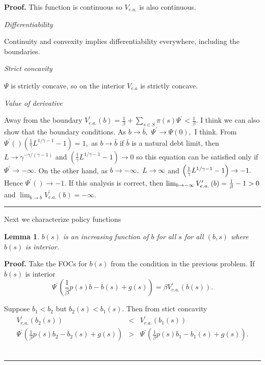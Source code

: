 \documentclass{article}
\newtheorem{lemma}[theorem]{Lemma}
\newenvironment{proof}[1][Proof]{\noindent\textbf{#1.} }{\ \rule{0.5em}{0.5em}}
\begin{document}
\begin{proof}
This function is continuous so $V_{e.a.}$ is also continuous.

\textit{Differentiability}

Continuity and convexity implies differentiability everywhere, including the
boundaries.

\textit{Strict concavity}

$\Psi $ is strictly concave, so on the interior $V_{e.a}$ is strictly
concave.

\textit{Value of derivative}

Away from the boundary $V_{e.a.}^{\prime }\left( b\right) =\frac{1}{\beta }%
+\sum_{s\in S}\pi \left( s\right) \Psi ^{\prime }<\frac{1}{\beta }.$ I think
we can also show that the boundary conditions. As $b\rightarrow \bar{b},$ $%
\Psi ^{\prime }\rightarrow \Psi \left( 0\right) ,$ I think. From $\Psi
^{\prime }\left( {}\right) \left( \frac{1}{\gamma }L^{1/\gamma -1}-1\right)
=1,$ as $b\rightarrow \bar{b}$ if $\bar{b}$ is a natural debt limit, then $%
L\rightarrow \gamma ^{-\gamma /\left( \gamma -1\right) }$ and $\left( \frac{1%
}{\gamma }L^{1/\gamma -1}-1\right) \rightarrow 0$ so this equation can be
satisfied only if $\Psi ^{\prime }\rightarrow -\infty .$ On the other hand,
as $b\rightarrow -\infty ,$ $L\rightarrow \infty $ and $\left( \frac{1}{%
\gamma }L^{1/\gamma -1}-1\right) \rightarrow -1.$ Hence $\Psi ^{\prime
}\left( {}\right) \rightarrow -1.$ If this analysis is correct, then $%
\lim_{b\rightarrow -\infty }V_{e.a.}^{\prime }\left( b\right) =\frac{1}{%
\beta }-1>0$ and $\lim_{b\rightarrow \bar{b}}V_{e.a.}^{\prime }\left(
b\right) =-\infty .$
\end{proof}

\smallskip Next we characterize policy functions

\begin{lemma}
$b\left( s\right) $ is an increasing function of $b$ for all $s$ for all $%
\left( b,s\right) $ where $b\left( s\right) $ is interior.
\end{lemma}

\begin{proof}
Take the FOCs for $b\left( s\right) $ from the condition in the previous
problem. If $b\left( s\right) $ is interior%
\[
\Psi ^{\prime }\left( \frac{1}{\beta }p\left( s\right) b-b\left( s\right)
+g\left( s\right) \right) =\beta V_{e.a.}^{\prime }\left( b\left( s\right)
\right) . 
\]

Suppose $b_{1}<b_{2}$ but $b_{2}\left( s\right) <b_{1}\left( s\right) .$
Then from stict concavity%
\begin{eqnarray*}
V_{e.a.}^{\prime }\left( b_{2}\left( s\right) \right) &<&V_{e.a.}^{\prime
}\left( b_{1}\left( s\right) \right) \\
\Psi ^{\prime }\left( \frac{1}{\beta }p\left( s\right) b_{2}-b_{2}\left(
s\right) +g\left( s\right) \right) &>&\Psi ^{\prime }\left( \frac{1}{\beta }%
p\left( s\right) b_{1}-b_{1}\left( s\right) +g\left( s\right) \right) .
\end{eqnarray*}
\end{proof}
\end{document}
